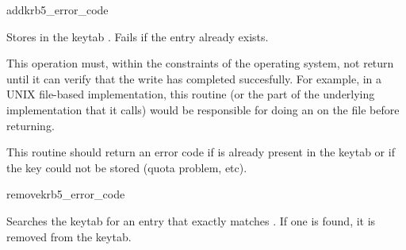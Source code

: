 \begin{funcdecl}{add}{krb5_error_code}{\funcin}
\end{funcdecl}

Stores  in the keytab .
Fails if the entry already exists.

This operation must, within the constraints of the operating system, not
return until it can verify that the write has completed succesfully.
For example, in a UNIX file-based implementation, this routine (or the part
of the underlying implementation that it calls) would be responsible for
doing an  on the file before returning.

This routine should return an error code if  is
already present in the keytab or if the key could not be stored (quota
problem, etc).

\begin{funcdecl}{remove}{krb5_error_code}{\funcin}
\end{funcdecl}

Searches the keytab  for an entry that exactly matches
.  If one is found, it is removed from the keytab.


